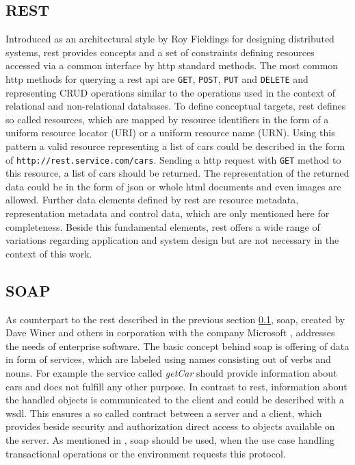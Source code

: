 \subsection{REST}
\label{ch:Fundamentals:sec:Data Exchange:ssec:REST}

Introduced as an architectural style by Roy Fieldings \cite{patni_pro_2017} for designing distributed systems, \acrfull{rest} provides concepts and a set of constraints defining resources accessed via a common interface by \acrshort{http} standard methods.
The most common \acrshort{http} methods for querying a \acrshort{rest} \acrshort{api} are \verb|GET|, \verb|POST|, \verb|PUT| and \verb|DELETE| and representing CRUD operations similar to the operations used in the context of relational and non-relational databases.
To define conceptual targets, \acrshort{rest} defines so called resources, which are mapped by resource identifiers in the form of a uniform resource locator (URI) or a uniform resource name (URN). Using this pattern a valid resource representing a list of cars could be described in the form of \verb|http://rest.service.com/cars|. 
Sending a \acrshort{http} request with  \verb|GET| method to this resource, a list of cars should be returned.
The representation of the returned data could be in the form of \acrshort{json} or whole \acrshort{html} documents and even images are allowed.
Further data elements defined by \acrshort{rest} are resource metadata, representation metadata and control data, which are only mentioned here for completeness. 
Beside this fundamental elements, \acrshort{rest} offers a wide range of variations regarding application and system design but are not necessary in the context of this work.

\subsection{SOAP}
\label{ch:Fundamentals:sec:Data Exchange:ssec:SOAP}

As counterpart to the \acrshort{rest} described in the previous section \ref{ch:Fundamentals:sec:Data Exchange:ssec:REST}, \acrshort{soap}, created by Dave Winer and others in corporation with the company Microsoft \cite{patni_pro_2017}, addresses the needs of enterprise software.
The basic concept behind \acrshort{soap} is offering of data in form of services, which are labeled using names consisting out of verbs and nouns. For example the service called \textit{getCar} should provide information about cars and does not fulfill any other purpose.
In contrast to \acrshort{rest}, information about the handled objects is communicated to the client and could be described with a \acrshort{wsdl}.
This ensures a so called contract between a server and a client, which provides beside security and authorization direct access to objects available on the server.
As mentioned in \cite[4]{patni_pro_2017}, \acrshort{soap} should be used, when the use case handling transactional operations or the environment requests this protocol.

